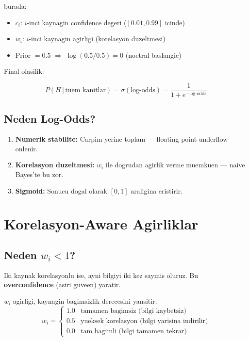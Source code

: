 \documentclass[12pt,a4paper,oneside]{book}
\theoremstyle{definition}
\newcommand{\prob}[1]{P\!\left(#1\right)}
\newcommand{\given}{\,|\,}
\newcommand{\sigmoid}{\sigma}
\begin{document}
burada:
\begin{itemize}
\item $c_i$: $i$-inci kaynag\-in confidence degeri ($[0.01, 0.99]$ icinde)
\item $w_i$: $i$-inci kaynag\-in agirligi (korelasyon duzeltmesi)
\item Prior $= 0.5$ $\Rightarrow$ $\log(0.5/0.5) = 0$ (noetral baslangic)
\end{itemize}

Final olasilik:

\begin{equation}
\prob{H \given \text{tuem kanitlar}} = \sigmoid(\text{log-odds}) = \frac{1}{1 + e^{-\text{log-odds}}}
\label{eq:sigmoid}
\end{equation}

\subsection{Neden Log-Odds?}

\begin{enumerate}
\item \textbf{Numerik stabilite:} Carpim yerine toplam --- floating point underflow onlenir.
\item \textbf{Korelasyon duzeltmesi:} $w_i$ ile dogrudan agirlik verme muemkuen --- naive Bayes'te bu zor.
\item \textbf{Sigmoid:} Sonucu dogal olarak $[0, 1]$ araligina eristirir.
\end{enumerate}

\section{Korelasyon-Aware Agirliklar}
\label{sec:correlation}

\subsection{Neden $w_i < 1$?}

Iki kaynak korelasyonlu ise, ayni bilgiyi iki kez saymis oluruz. Bu \textbf{overconfidence} (asiri guveen) yaratir.

\begin{tanim}
$w_i$ agirligi, kaynag\-in bagimsizlik derecesini yansitir:
\begin{equation}
w_i = \begin{cases}
1.0 & \text{tamamen bagimsiz (bilgi kaybetsiz)} \\
0.5 & \text{yueksek korelasyon (bilgi yarisina indirilir)} \\
0.0 & \text{tam bagimli (bilgi tamamen tekrar)}
\end{cases}
\end{equation}
\end{tanim}
\end{document}
